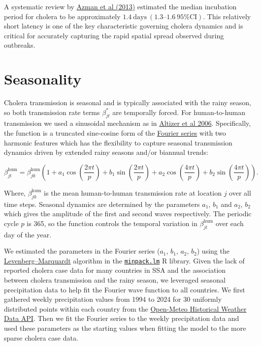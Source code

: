 \documentclass[
]{book}
\begin{document}
A systematic review by \href{http://www.sciencedirect.com/science/article/pii/S0163445312003477}{Azman et al (2013)} estimated the median incubation period for cholera to be approximately \(1.4 \ \text{days} \ (1.3–1.6 \ 95\% \text{CI})\). This relatively short latency is one of the key characteristic governing cholera dynamics and is critical for accurately capturing the rapid spatial spread observed during outbreaks.

\section{Seasonality}\label{seasonality}

Cholera transmission is seasonal and is typically associated with the rainy season, so both transmission rate terms \(\beta_{jt}^{\text{*}}\) are temporally forced. For human-to-human transmission we used a sinusoidal mechanism as in \href{https://onlinelibrary.wiley.com/doi/epdf/10.1111/j.1461-0248.2005.00879.x}{Altizer et al 2006}. Specifically, the function is a truncated sine-cosine form of the \href{https://en.wikipedia.org/wiki/Fourier_series}{Fourier series} with two harmonic features which has the flexibility to capture seasonal transmission dynamics driven by extended rainy seasons and/or biannual trends:

\begin{equation}
\beta_{jt}^{\text{hum}} = \beta_{j0}^{\text{hum}} \left(1 + a_1 \cos\left(\frac{2\pi t}{p}\right) + b_1 \sin\left(\frac{2\pi t}{p}\right) + a_2 \cos\left(\frac{4\pi t}{p}\right) + b_2 \sin\left(\frac{4\pi t}{p}\right)\right).
\label{eq:beta1}
\end{equation}

Where, \(\beta_{j0}^{\text{hum}}\) is the mean human-to-human transmission rate at location \(j\) over all time steps. Seasonal dynamics are determined by the parameters \(a_1\), \(b_1\) and \(a_2\), \(b_2\) which gives the amplitude of the first and second waves respectively. The periodic cycle \(p\) is 365, so the function controls the temporal variation in \(\beta_{jt}^{\text{hum}}\) over each day of the year.

We estimated the parameters in the Fourier series (\(a_1\), \(b_1\), \(a_2\), \(b_2\)) using the \href{https://en.wikipedia.org/wiki/Levenberg\%E2\%80\%93Marquardt_algorithm}{Levenberg--Marquardt} algorithm in the \href{https://rdrr.io/cran/minpack.lm/}{\texttt{minpack.lm}} R library. Given the lack of reported cholera case data for many countries in SSA and the association between cholera transmission and the rainy season, we leveraged seasonal precipitation data to help fit the Fourier wave function to all countries. We first gathered weekly precipitation values from 1994 to 2024 for 30 uniformly distributed points within each country from the \href{https://open-meteo.com/en/docs/historical-weather-api}{Open-Meteo Historical Weather Data API}. Then we fit the Fourier series to the weekly precipitation data and used these parameters as the starting values when fitting the model to the more sparse cholera case data.
\end{document}
